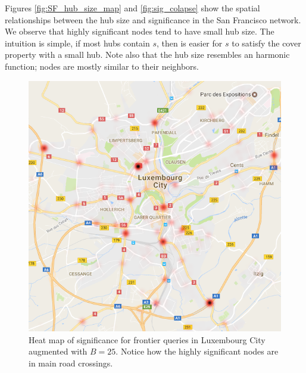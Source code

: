 Figures \ref{fig:SF_hub_size_map} and \ref{fig:sig_colapse} show the spatial relationships between the hub size and significance in the San Francisco network. 
We observe that highly significant nodes tend to have small hub size.
The intuition is simple, if most hubs contain $s$, then is easier for $s$ to satisfy the cover property with a small hub.
Note also that the hub size resembles an harmonic function; nodes are mostly similar to their neighbors.

\begin{figure}
\begin{minipage}[t]{.53\textwidth}
\centering
\includegraphics[scale=0.3]{TexImg/map_LU_sig.png}
\caption{Heat map of significance for frontier queries in Luxembourg City augmented with $B=25$.
Notice how the highly significant nodes are in main road crossings.}
\label{fig:map_LU} 
\end{minipage}
\end{figure}